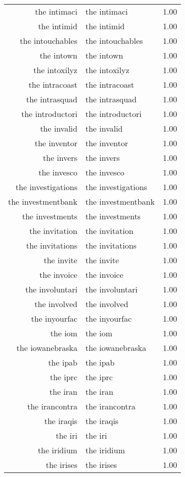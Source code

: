 \begin{table}[ht]
\begin{tabular}{rlr}
  the intimaci & the intimaci & 1.00 \\ 
  the intimid & the intimid & 1.00 \\ 
  the intouchables & the intouchables & 1.00 \\ 
  the intown & the intown & 1.00 \\ 
  the intoxilyz & the intoxilyz & 1.00 \\ 
  the intracoast & the intracoast & 1.00 \\ 
  the intrasquad & the intrasquad & 1.00 \\ 
  the introductori & the introductori & 1.00 \\ 
  the invalid & the invalid & 1.00 \\ 
  the inventor & the inventor & 1.00 \\ 
  the invers & the invers & 1.00 \\ 
  the invesco & the invesco & 1.00 \\ 
  the investigations & the investigations & 1.00 \\ 
  the investmentbank & the investmentbank & 1.00 \\ 
  the investments & the investments & 1.00 \\ 
  the invitation & the invitation & 1.00 \\ 
  the invitations & the invitations & 1.00 \\ 
  the invite & the invite & 1.00 \\ 
  the invoice & the invoice & 1.00 \\ 
  the involuntari & the involuntari & 1.00 \\ 
  the involved & the involved & 1.00 \\ 
  the inyourfac & the inyourfac & 1.00 \\ 
  the iom & the iom & 1.00 \\ 
  the iowanebraska & the iowanebraska & 1.00 \\ 
  the ipab & the ipab & 1.00 \\ 
  the iprc & the iprc & 1.00 \\ 
  the iran & the iran & 1.00 \\ 
  the irancontra & the irancontra & 1.00 \\ 
  the iraqis & the iraqis & 1.00 \\ 
  the iri & the iri & 1.00 \\ 
  the iridium & the iridium & 1.00 \\ 
  the irises & the irises & 1.00 \\ 

\end{tabular}
\end{table}
